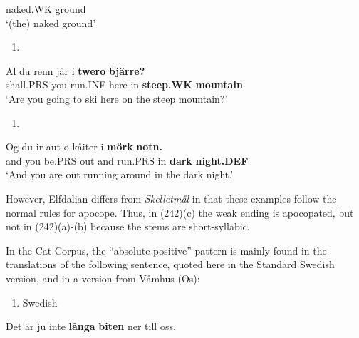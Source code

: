 naked.WK  ground\\ %


‘(the) naked ground’
\z


\begin{enumerate} %
\item 
\end{enumerate} %
\ea\label{}
\gll Al  du  renn  jär  i  \textbf{twero}\textbf{  bjärre?}\\


shall.PRS  you  run.INF  here  in  \textbf{steep.WK} \textbf{mountain}\\ %


‘Are you going to ski here on the steep mountain?’
\z


\begin{enumerate} %
\item 
\end{enumerate} %
\ea\label{}
\gll Og  du  ir  aut  o  kåiter  i  \textbf{mörk}\textbf{  notn.}\\


and  you  be.PRS  out  and  run.PRS  in  \textbf{dark} \textbf{night.DEF}\\ %


‘And you are out running around in the dark night.’
\z


However, Elfdalian differs from \textit{Skelletmål} in that these examples follow the normal rules for apocope. Thus, in (242)(c) the weak ending is apocopated, but not in (242)(a){}-(b) because the stems are short-syllabic.

In the Cat Corpus, the “absolute positive” pattern is mainly found in the translations of the following sentence, quoted here in the Standard Swedish version, and in a version from Våmhus (Os):

\begin{enumerate} %
\item 
Swedish

\end{enumerate} %
\ea\label{}
\gll Det  är  ju  inte  \textbf{långa}\textbf{  biten} ner  till  oss.\\


